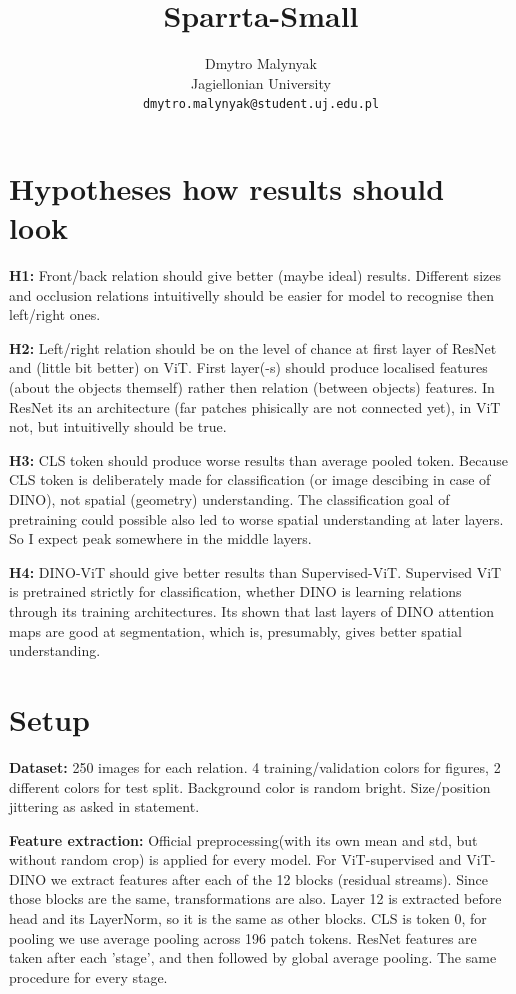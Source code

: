 \documentclass{article}
\title{Sparrta-Small}
\author{Dmytro Malynyak \\ Jagiellonian University \\ \texttt{dmytro.malynyak@student.uj.edu.pl}}
\begin{document}
\maketitle

\section{Hypotheses how results should look}

\textbf{H1:} Front/back relation should give better (maybe ideal) results. Different sizes and occlusion relations intuitivelly should be easier for model to recognise then left/right ones.

\textbf{H2:} Left/right relation should be on the level of chance at first layer of ResNet and (little bit better) on ViT. First layer(-s) should produce localised features (about the objects themself) rather then relation (between objects) features. In ResNet its an architecture (far patches phisically are not connected yet), in ViT not, but intuitivelly should be true. 

\textbf{H3:} CLS token should produce worse results than average pooled token. Because CLS token is deliberately made for classification (or image descibing in case of DINO), not spatial (geometry) understanding. The classification goal of pretraining could possible also led to worse spatial understanding at later layers. So I expect peak somewhere in the middle layers. 

\textbf{H4:} DINO-ViT should give better results than Supervised-ViT. Supervised ViT is pretrained strictly for classification, whether DINO is learning relations through its training architectures. Its shown that last layers of DINO attention maps are good at segmentation, which is, presumably, gives better spatial understanding.

\section{Setup}

\textbf{Dataset: } 250 images for each relation. 4 training/validation colors for figures, 2 different colors for test split. Background color is random bright. Size/position jittering as asked in statement. 

\textbf{Feature extraction: } Official preprocessing(with its own mean and std, but without random crop) is applied for every model. For ViT-supervised and ViT-DINO we extract features after each of the 12 blocks (residual streams). Since those blocks are the same, transformations are also. Layer 12 is extracted before head and its LayerNorm, so it is the same as other blocks. CLS is token 0, for pooling we use average pooling across 196 patch tokens. ResNet features are taken after each 'stage', and then followed by global average pooling. The same procedure for every stage. 
\end{document}

